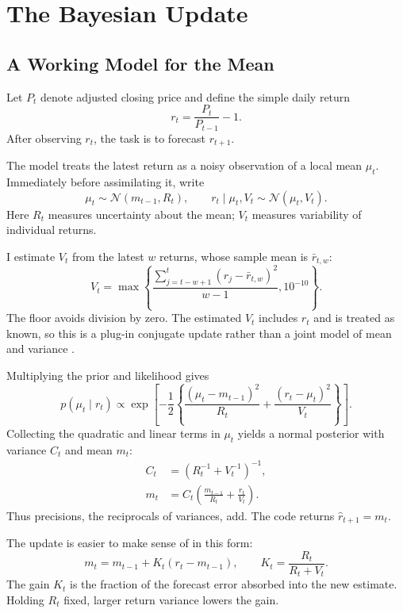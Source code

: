 \documentclass[conference]{IEEEtran}
\begin{document}
\section{The Bayesian Update}
\subsection{A Working Model for the Mean}
Let $P_t$ denote adjusted closing price and define the simple daily return
\begin{equation}
 r_t = \frac{P_t}{P_{t-1}}-1.
\end{equation}
After observing $r_t$, the task is to forecast $r_{t+1}$.

The model treats the latest return as a noisy observation of a local mean $\mu_t$. Immediately before assimilating it, write
\begin{equation}
 \mu_t\sim\mathcal N(m_{t-1},R_t),\qquad
 r_t\mid\mu_t,V_t\sim\mathcal N(\mu_t,V_t).
 \label{eq:model}
\end{equation}
Here $R_t$ measures uncertainty about the mean; $V_t$ measures variability of individual returns.

I estimate $V_t$ from the latest $w$ returns, whose sample mean is $\bar r_{t,w}$:
\begin{equation}
 V_t=\max\left\{\frac{\sum_{j=t-w+1}^{t}(r_j-\bar r_{t,w})^2}{w-1},10^{-10}\right\}.
 \label{eq:variance}
\end{equation}
The floor avoids division by zero. The estimated $V_t$ includes $r_t$ and is treated as known, so this is a plug-in conjugate update rather than a joint model of mean and variance \cite{murphy}.

Multiplying the prior and likelihood gives
\begin{equation}
 p(\mu_t\mid r_t)\propto
 \exp\left[-\frac12\left\{
 \frac{(\mu_t-m_{t-1})^2}{R_t}
 +\frac{(r_t-\mu_t)^2}{V_t}\right\}\right].
\end{equation}
Collecting the quadratic and linear terms in $\mu_t$ yields a normal posterior with variance $C_t$ and mean $m_t$:
\begin{align}
 C_t&=\left(R_t^{-1}+V_t^{-1}\right)^{-1},\label{eq:postvar}\\
 m_t&=C_t\left(\frac{m_{t-1}}{R_t}+\frac{r_t}{V_t}\right).
 \label{eq:postmean}
\end{align}
Thus precisions, the reciprocals of variances, add. The code returns $\hat r_{t+1}=m_t$.

The update is easier to make sense of in this form:
\begin{equation}
 m_t=m_{t-1}+K_t(r_t-m_{t-1}),\qquad
 K_t=\frac{R_t}{R_t+V_t}.
 \label{eq:gain}
\end{equation}
The gain $K_t$ is the fraction of the forecast error absorbed into the new estimate. Holding $R_t$ fixed, larger return variance lowers the gain. 
\end{document}
